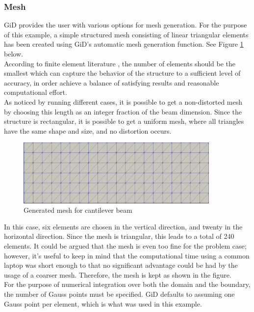 \subsubsection{Mesh}
GiD provides the user with various options for mesh generation. For the purpose of this example, a simple structured mesh consisting of linear triangular elements has been created using GiD's automatic mesh generation function. See Figure \ref{cantileverBeam:mesh} below. \\[3pt]
According to finite element literature \cite{FEM_felippa}, the number of elements should be the smallest which can capture the behavior of the structure to a sufficient level of accuracy, in order achieve a balance of satisfying results and reasonable computational effort. \\[3pt]
As noticed by running different cases, it is possible to get a non-distorted mesh by choosing this length as an integer fraction of the beam dimension. Since the structure is rectangular, it is possible to get a uniform mesh, where all triangles have the same shape and size, and no distortion occurs. \\[3pt]
\begin{figure}[ht]
\centering
  \includegraphics[width=100mm]{images/mesh.png}
  \caption{Generated mesh for cantilever beam}
  \label{cantileverBeam:mesh}
\end{figure}
In this case, six elements are chosen in the vertical direction, and twenty in the horizontal direction. Since the mesh is triangular, this leads to a total of 240 elements. It could be argued that the mesh is even too fine for the problem case; however, it's useful to keep in mind that the computational time using a common laptop was short enough to that no significant advantage could be had by the usage of a coarser mesh. Therefore, the mesh is kept as shown in the figure.\\[3pt]
For the purpose of numerical integration over both the domain and the boundary, the number of Gauss points must be specified. GiD defaults to assuming one Gauss point per element, which is what was used in this example.\\[3pt]


